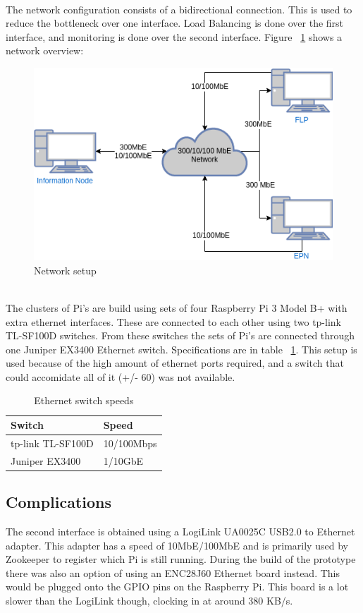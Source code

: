 \newpage

~\\ The network configuration consists of a bidirectional connection. This is used to reduce the bottleneck over one interface. Load Balancing is done over the first interface, and monitoring is done over the second interface. Figure ~\ref{fig:NetworkSetup} shows a network overview:
\begin{figure}[htb]
    \centering
    \includegraphics[scale=0.5]{./graphics/Network_thesis.png}
    \caption{Network setup}
    \label{fig:NetworkSetup}
\end{figure}

~\\ The clusters of Pi's are build using sets of four Raspberry Pi 3 Model B+ with extra ethernet interfaces. These are connected to each other using two tp-link TL-SF100D switches. From these switches the sets of Pi's are connected through one Juniper EX3400 Ethernet switch. Specifications are in table ~\ref{table:EthernetSpeeds}. This setup is used because of the high amount of ethernet ports required, and a switch that could accomidate all of it (+/- 60) was not available.

\begin{table}[htb]
\begin{tabular}{| l | l |}
\hline
Switch & Speed \\ \hline
tp-link TL-SF100D & 10/100Mbps \\ \hline
Juniper EX3400 & 1/10GbE \\
\hline
\end{tabular}
\caption{Ethernet switch speeds}
\label{table:EthernetSpeeds}
\end{table}

\subsection{Complications}
The second interface is obtained using a LogiLink UA0025C USB2.0 to Ethernet adapter. This adapter has a speed of 10MbE/100MbE and is primarily used by Zookeeper to register which Pi is still running. During the build of the prototype there was also an option of using an ENC28J60 Ethernet board instead. This would be plugged onto the GPIO pins on the Raspberry Pi. This board is a lot slower than the LogiLink though, clocking in at around 380 KB/s. 

